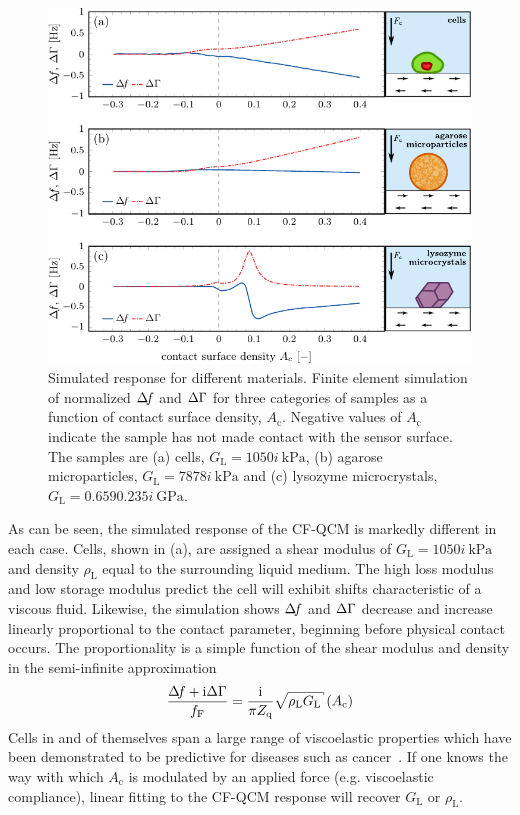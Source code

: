 \begin{figure}[ht]
 \centering
\includegraphics{qcm/figures/multisweep.pdf}
\caption{Simulated response for different materials.  Finite element simulation of normalized $\Delta\!f$ and $\Delta\Gamma$ for three
 categories of samples as a function of contact surface density, 
 $A_\mathrm{c}$.
	Negative values of $A_\mathrm{c}$ indicate the sample has not made contact with the sensor
 surface.
 The samples are (a) cells, $G_\mathrm{L}=\SI{10+50i}{\kilo\pascal}$, (b)
 agarose microparticles, $G_\mathrm{L}=\SI{78+78i}{\kilo\pascal}$ and (c) lysozyme
 microcrystals, $G_\mathrm{L}=\SI{0.659+0.235i}{\giga\pascal}$.  }
\label{fig:multisweep}
\end{figure}

As can be seen, the simulated response of the CF-QCM is markedly different
in each case. Cells, shown in (a), are assigned a
shear modulus of
$G_\mathrm{L}=\SI{10+50i}{\kilo\pascal}$~\cite{li2008thickness}~\cite{mahaffy2004quantitative} and density
$\rho_\mathrm{L}$ equal to the surrounding liquid medium.  The high loss
modulus and low storage modulus predict the cell will exhibit shifts
characteristic of a viscous fluid.  Likewise, the simulation shows $\Delta\!f$
and $\Delta\Gamma$ decrease and increase linearly proportional to the contact
parameter, beginning before physical contact occurs.  The proportionality
is a simple function of the shear modulus and density in the
semi-infinite approximation~\cite{flanigan2000contact}~\cite{kanazawa1985frequency}
\begin{equation}
 \frac{\df+\mi\dg}{f_\mathrm{F}}=\frac{\mi}{\pi Z_\mathrm{q}}\sqrt{\rho_\mathrm{L} G_\mathrm{L}}
 \left(A_\mathrm{c}\right)
\end{equation}
 Cells in and of
themselves span a large range of viscoelastic properties which have been
demonstrated to be predictive for diseases such as
cancer~\cite{rebelo2013comparison}.  If one knows the way with which
$A_\mathrm{c}$ is modulated by an applied force (e.g. viscoelastic
compliance), linear fitting to
the CF-QCM response will recover $G_\mathrm{L}$ or $\rho_\mathrm{L}$.


